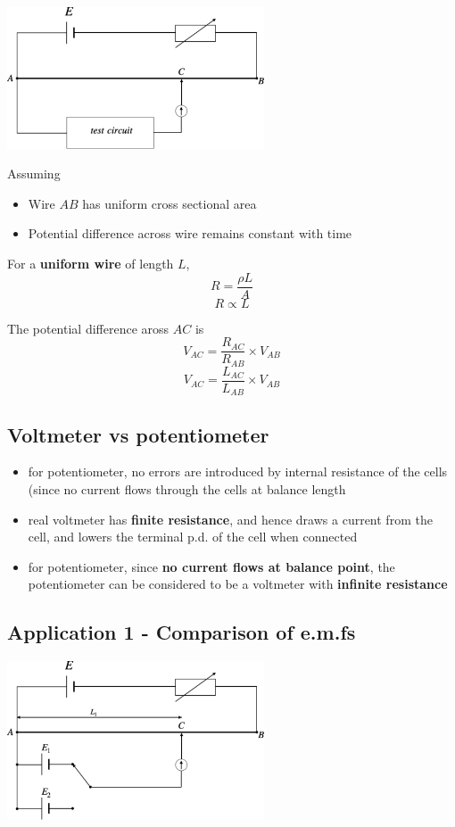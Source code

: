 \documentclass[a4paper, 10pt]{article}
\begin{document}
\begin{center}
  \includegraphics[width=3in]{figures/3.pdf} 
\end{center}	

Assuming 
\begin{itemize}
   \item Wire $AB$ has uniform cross sectional area
   \item Potential difference across wire remains constant with time
\end{itemize}	

For a \textbf{uniform wire} of length $L$,
\[
   R = \frac{\rho L}{A}
\]
\[
R \propto L
\]

The potential difference aross $AC$ is
\[
   V_{AC} = \frac{R_{AC}}{R_{AB}} \times V_{AB}
\]
\[
   V_{AC} = \frac{L_{AC}}{L_{AB}} \times V_{AB}
\]

\subsection{Voltmeter vs potentiometer}
\begin{itemize}
   \item for potentiometer, no errors are introduced by internal resistance of the cells (since no current flows through the cells at balance length
   \item real voltmeter has \textbf{finite resistance}, and hence draws a current from the cell, and lowers the terminal p.d. of the cell when connected
   \item for potentiometer, since \textbf{no current flows at balance point}, the potentiometer can be considered to be a voltmeter with \textbf{infinite resistance} 
\end{itemize}

\subsection{Application 1 - Comparison of e.m.fs}
\begin{center}
   \includegraphics[width=3in]{figures/4.pdf} 
\end{center}	
\end{document}
